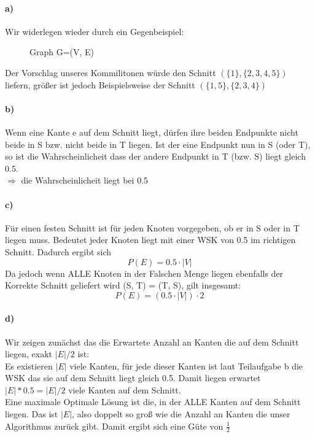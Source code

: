 \documentclass[a4paper]{article}
\begin{document}
\paragraph*{a)}
Wir widerlegen wieder durch ein Gegenbeispiel:
\begin{figure}[H]
    \centering
\caption{Graph G=(V, E)}
\end{figure}
Der Vorschlag unseres Kommilitonen würde den Schnitt  $(\{1\}, \{2, 3, 4, 5\})$ liefern, größer
ist jedoch Beispielsweise der Schnitt  $(\{1, 5\}, \{2, 3, 4\})$
\paragraph*{b)}
Wenn eine Kante e auf dem Schnitt liegt, dürfen ihre beiden Endpunkte nicht beide in S bzw. nicht
beide in T liegen. Ist der eine Endpunkt nun in S (oder T), so ist die Wahrscheinlicheit dass der 
andere Endpunkt in T (bzw. S) liegt gleich 0.5. \\
$\Rightarrow$ die Wahrscheinlicheit liegt bei 0.5
\paragraph*{c)}
Für einen festen Schnitt ist für jeden Knoten vorgegeben, ob er in S oder in T liegen muss. 
Bedeutet jeder Knoten liegt mit einer WSK von 0.5 im richtigen Schnitt. Dadurch
ergibt sich 
\[
    P(E) = 0.5 \cdot |V|  
\]
Da jedoch wenn ALLE Knoten in der Falschen Menge liegen ebenfalls der Korrekte Schnitt
geliefert wird (S, T) = (T, S), gilt insgesamt:
\[
    P(E) = (0.5 \cdot |V|) \cdot 2
\]
\paragraph*{d)}
Wir zeigen zunächst das die Erwartete Anzahl an Kanten die auf dem Schnitt liegen, exakt
$|E| / 2$ ist: \\
Es existieren $|E|$ viele Kanten, für jede dieser Kanten ist laut Teilaufgabe b die WSK
das sie auf dem Schnitt liegt gleich 0.5. Damit liegen erwartet $|E| * 0.5 = |E| / 2$ viele
Kanten auf dem Schnitt. \\
Eine maximale Optimale Lösung ist die, in der ALLE Kanten auf dem Schnitt liegen. Das ist
$|E|$, also doppelt so groß wie die Anzahl an Kanten die unser Algorithmus zurück gibt.
Damit ergibt sich eine Güte von $\frac{1}{2}$
\end{document}
